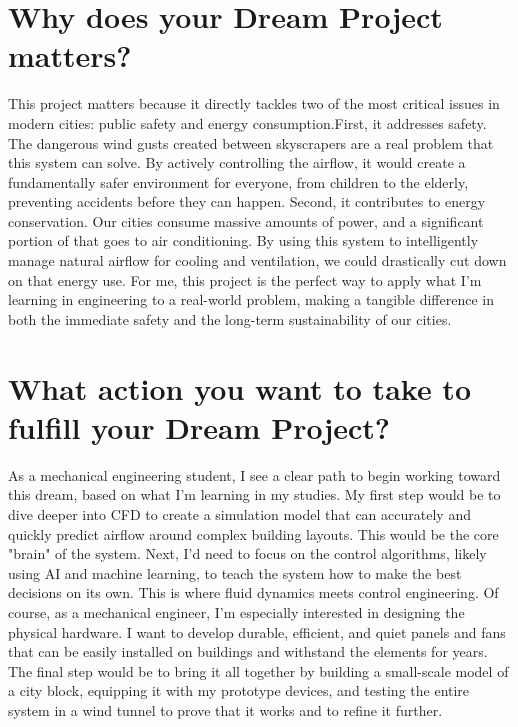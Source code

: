 \documentclass{article}
\begin{document}
\section{Why does your Dream Project matters?}
This project matters because it directly tackles two of the most critical issues in modern cities: public safety and energy consumption.First, it addresses safety. The dangerous wind gusts created between skyscrapers are a real problem that this system can solve.\cite{texbook} By actively controlling the airflow, it would create a fundamentally safer environment for everyone, from children to the elderly, preventing accidents before they can happen. Second, it contributes to energy conservation. Our cities consume massive amounts of power, and a significant portion of that goes to air conditioning. By using this system to intelligently manage natural airflow for cooling and ventilation, we could drastically cut down on that energy use. For me, this project is the perfect way to apply what I'm learning in engineering to a real-world problem, making a tangible difference in both the immediate safety and the long-term sustainability of our cities.

\section{What action you want to take to fulfill your Dream Project?}
As a mechanical engineering student, I see a clear path to begin working toward this dream, based on what I'm learning in my studies. My first step would be to dive deeper into CFD to create a simulation model that can accurately and quickly predict airflow around complex building layouts. This would be the core "brain" of the system. Next, I'd need to focus on the control algorithms, likely using AI and machine learning, to teach the system how to make the best decisions on its own. This is where fluid dynamics meets control engineering. Of course, as a mechanical engineer, I'm especially interested in designing the physical hardware. I want to develop durable, efficient, and quiet panels and fans that can be easily installed on buildings and withstand the elements for years. The final step would be to bring it all together by building a small-scale model of a city block, equipping it with my prototype devices, and testing the entire system in a wind tunnel to prove that it works and to refine it further.
\end{document}
